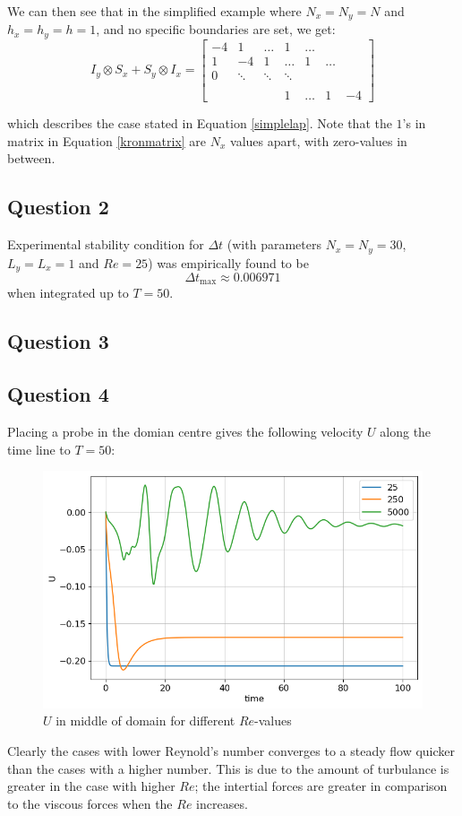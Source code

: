 \documentclass[10pt]{report}
\begin{document}
We can then see that in the simplified example where $N_x = N_y = N$ and $h_x = h_y = h = 1$, and no specific boundaries are set, we get:
\begin{equation}
    I_y \otimes S_x + S_y \otimes I_x = \begin{bmatrix}
        -4&1&\hdots&1&\hdots\\
        1&-4&1&\hdots&1&\hdots\\
        0 &\ddots&\ddots &\ddots \\\\
        &&&1&\hdots&1&-4
    \end{bmatrix} \label{kronmatrix}
\end{equation}

which describes the case stated in Equation \ref{simplelap}. Note that the $1$'s in matrix in Equation \ref{kronmatrix} are $N_x$ 
values apart, with zero-values in between.
\subsection*{Question 2}
Experimental stability condition for $\Delta t$ 
(with parameters $N_x = N_y = 30$, $L_y = L_x = 1$ and $Re = 25$) was empirically found to be
\[
\Delta t_{\text{max}} \approx 0.006971
\]
when integrated up to $T = 50$.

\subsection*{Question 3}

\subsection*{Question 4}
Placing a probe in the domian centre gives the following velocity $U$ along the time line to $T = 50$:
\begin{figure}[H]
    \centering
    \includegraphics[width = \textwidth]{plots/plot1.png}
    \caption{$U$ in middle of domain for different $Re$-values}
    \label{plot1}
\end{figure}
Clearly the cases with lower Reynold's number converges to a steady flow quicker than the cases with
a higher number. This is due to the amount of turbulance is greater in the case with higher $Re$; 
the intertial forces are greater in comparison to the viscous forces when the $Re$ increases.
\end{document}

